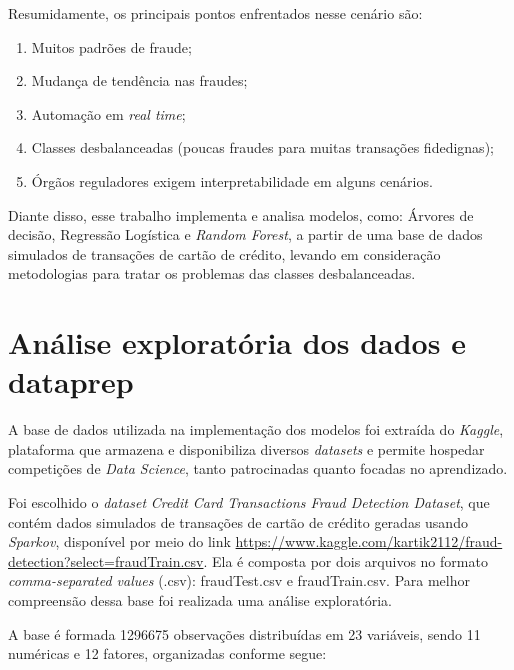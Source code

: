 \documentclass{article}
\begin{document}
Resumidamente, os principais pontos enfrentados nesse cenário são:
\begin{enumerate}
    \item Muitos padrões de fraude;
    \item Mudança de tendência nas fraudes;
    \item Automação em \textit{real time};
    \item Classes desbalanceadas (poucas fraudes para muitas transações fidedignas);
    \item Órgãos reguladores exigem interpretabilidade em alguns cenários.
\end{enumerate}

Diante disso, esse trabalho implementa e analisa modelos, como: Árvores de decisão, Regressão Logística e \textit{Random Forest}, a partir de uma base de dados simulados de transações de cartão de crédito, levando em consideração metodologias para tratar os problemas das classes desbalanceadas. 

\section{Análise exploratória dos dados e dataprep}

A base de dados utilizada na implementação dos modelos foi extraída do \textit{Kaggle}, plataforma que armazena e disponibiliza diversos \textit{datasets} e permite hospedar competições de \textit{Data Science}, tanto patrocinadas quanto focadas no aprendizado.

Foi escolhido o \textit{dataset} \textit{Credit Card Transactions Fraud Detection Dataset}, que contém dados simulados de transações de cartão de crédito geradas usando \textit{Sparkov}, disponível por meio do link  \href{https://www.kaggle.com/kartik2112/fraud-detection?select=fraudTrain.csv}{https://www.kaggle.com/kartik2112/fraud-detection?select=fraudTrain.csv}. Ela é composta por dois arquivos no formato \textit{comma-separated values} (.csv): fraudTest.csv e fraudTrain.csv. Para melhor compreensão dessa base foi realizada uma análise exploratória.  

A base é formada 1296675 observações distribuídas em 23 variáveis, sendo 11 numéricas e 12 fatores, organizadas conforme segue:
\end{document}
